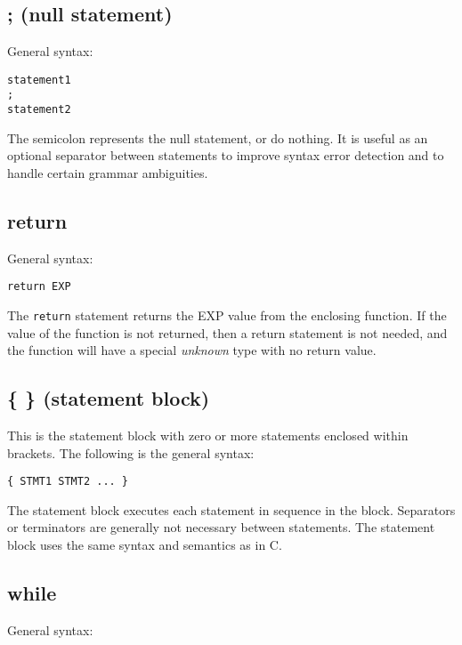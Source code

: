\documentclass[twoside,english]{article}
\newenvironment{vindent}
{\begin{list}{}{\setlength{\listparindent}{6pt}}
\item[]}
{\end{list}}
\begin{document}
\subsection{; (null statement)}
\index{;}
General syntax:

\begin{vindent}
\begin{verbatim}
statement1
;
statement2
\end{verbatim}
\end{vindent}
The semicolon represents the null statement, or do nothing. It is useful
as an optional separator between statements to improve syntax error detection
and to handle certain grammar ambiguities.


\subsection{return}
General syntax:

\begin{vindent}
\begin{verbatim}
return EXP
\end{verbatim}
\end{vindent}
The \texttt{return} statement returns the EXP value from the enclosing function.
If the value of the function is not returned, then a return statement is
not needed, and the function will have a special \emph{unknown} type with
no return value.

\subsection{\{ \} (statement block)}
\index{\{ \}}
This is the statement block with zero or more statements enclosed within
brackets. The following is the general syntax:

\begin{vindent}
\begin{verbatim}
{ STMT1 STMT2 ... }
\end{verbatim}
\end{vindent}
The statement block executes each statement in sequence in the block. Separators
or terminators are generally not necessary between statements. The statement
block uses the same syntax and semantics as in C.


\subsection{while}
General syntax:
\end{document}
